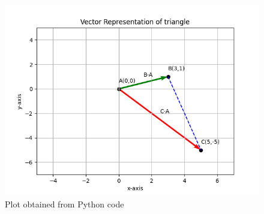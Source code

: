 \begin{figure}[h]
\centering
\includegraphics[width=\columnwidth]{solutions/3/4/5/image(graph).png}
\caption{Plot obtained from Python code}
\label{3/4/5/Fig:1}
\end{figure}

